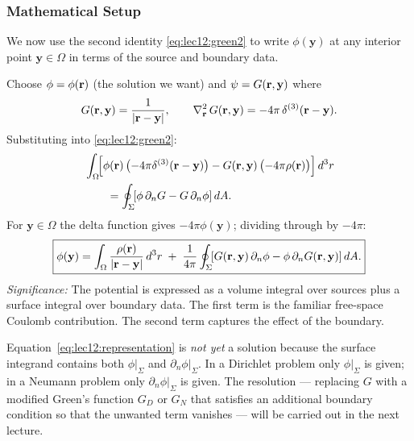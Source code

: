 \subsubsection*{Mathematical Setup}
We now use the second identity \eqref{eq:lec12:green2} to write $\phi(\mathbf{y})$ at
any interior point $\mathbf{y}\in\Omega$ in terms of the source and boundary data.

Choose $\phi = \phi(\mathbf{r})$ (the solution we want) and $\psi = G(\mathbf{r},\mathbf{y})$ where
\begin{equation}\label{eq:lec12:G-choice}
  G(\mathbf{r},\mathbf{y}) = \frac{1}{|\mathbf{r} - \mathbf{y}|},
  \qquad
  \nabla^2_{\mathbf{r}}\,G(\mathbf{r},\mathbf{y}) = -4\pi\,\delta^{(3)}(\mathbf{r}-\mathbf{y}).
\end{equation}
Substituting into \eqref{eq:lec12:green2}:
\begin{align}
  &\int_\Omega\!\!\left[\phi(\mathbf{r})\,\bigl(-4\pi\delta^{(3)}(\mathbf{r}-\mathbf{y})\bigr)
   - G(\mathbf{r},\mathbf{y})\,\bigl(-4\pi\rho(\mathbf{r})\bigr)\right]d^3r
  \notag\\
  &\qquad=
  \oint_\Sigma\!\!\left[\phi\,\partial_n G - G\,\partial_n\phi\right]dA .
  \label{eq:lec12:before-simplify}
\end{align}
For $\mathbf{y}\in\Omega$ the delta function gives $-4\pi\phi(\mathbf{y})$; dividing
through by $-4\pi$:
\begin{equation}\label{eq:lec12:representation}
  \boxed{
    \phi(\mathbf{y})
    =
    \int_\Omega \frac{\rho(\mathbf{r})}{|\mathbf{r}-\mathbf{y}|}\,d^3r
    \;+\;
    \frac{1}{4\pi}\oint_\Sigma
    \!\!\left[G(\mathbf{r},\mathbf{y})\,\partial_n\phi
    - \phi\,\partial_n G(\mathbf{r},\mathbf{y})\right]dA .
  }
\end{equation}
\textit{Significance:} The potential is expressed as a volume integral over sources
plus a surface integral over boundary data.  The first term is the familiar free-space
Coulomb contribution.  The second term captures the effect of the boundary.

\begin{remark}
  Equation~\eqref{eq:lec12:representation} is \emph{not yet} a solution because
  the surface integrand contains both $\phi|_\Sigma$ and $\partial_n\phi|_\Sigma$.
  In a Dirichlet problem only $\phi|_\Sigma$ is given; in a Neumann problem only
  $\partial_n\phi|_\Sigma$ is given.  The resolution — replacing $G$ with a modified
  Green's function $G_D$ or $G_N$ that satisfies an additional boundary condition
  so that the unwanted term vanishes — will be carried out in the next lecture.
\end{remark}

